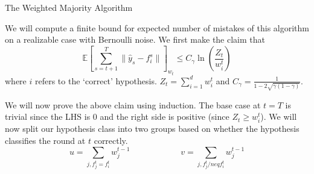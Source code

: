 \documentclass{article}
\begin{document}
\begin{algorithm}

    \Parameter{$\eta \in [0,1]$}
    \caption{The Weighted Majority Algorithm}
\end{algorithm}

We will compute a finite bound for expected number of mistakes of this algorithm on a realizable case with Bernoulli noise.
We first make the claim that
\begin{equation}
\label{main}
\mathbb{E}\left[\sum_{s=t+1}^{T}\|\hat{y}_s-f_i^s\|\right]_{w_t} \leq C_{\gamma} \ln\left(\frac{Z_t}{w_i^t}\right)
\end{equation}
where $i$ refers to the `correct' hypothesis. $Z_t = \sum_{i=1}^d w_i^t$ and \(C_{\gamma} = \frac{1}{1-2\sqrt{\gamma(1-\gamma)}}\).

	We will now prove the above claim using induction. The base case at $t=T$ is trivial since the LHS is $0$ and the right side is positive (since $Z_t \geq w_i^t$). We will now split our hypothesis class into two groups based on whether the hypothesis classifies the round at $t$ correctly.
\[
	u = \sum_{j, f_j^t = f_i^t} w_j^{t-1} \qquad\qquad  \qquad v = \sum_{j, f_j^t /neq f_i^t} w_j^{t-1}
\]
\end{document}
